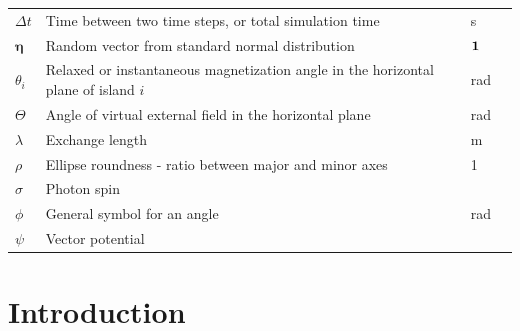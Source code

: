 \documentclass[11pt,a4paper,english]{article}
\renewcommand{\vec}[1]{\boldsymbol{#1}}
\begin{document}
\begin{longtable}{llll}
$\Delta t$ & Time between two time steps, or total simulation time & \si{\second} \\ %
$\vec{\eta}$ & Random vector from standard normal distribution & $\vb{1}$ \\
$\theta_i$ & Relaxed or instantaneous magnetization angle in the horizontal plane of island $i$ & \si{\radian} \\
$\Theta$ & Angle of virtual external field in the horizontal plane & \si{\radian} \\
$\lambda$ & Exchange length & \si{\metre} \\
$\rho$ & Ellipse roundness - ratio between major and minor axes & 1 \\
$\sigma$ & Photon spin & \si{} \\
$\phi$ & General symbol for an angle & \si{\radian} \\
$\psi$ & Vector potential & \\
\bottomrule
\end{longtable}



\clearpage
{}
\section{Introduction}
\end{document}

